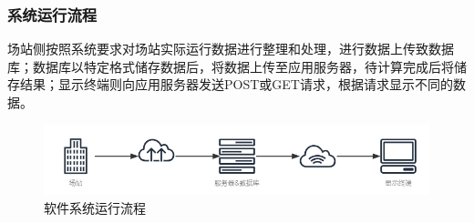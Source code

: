\documentclass[aspectratio=43, 10pt, utf8, mathserif]{beamer}
\begin{document}
	\begin{frame}
		\frametitle{系统运行流程}
		场站侧按照系统要求对场站实际运行数据进行整理和处理，进行数据上传致数据库；数据库以特定格式储存数据后，将数据上传至应用服务器，待计算完成后将储存结果；显示终端则向应用服务器发送POST或GET请求，根据请求显示不同的数据。
		\begin{figure}[H]
			\centering
			\includegraphics[width=0.95\linewidth]{pic/软件系统示意图}
			\caption{软件系统运行流程}
			\label{软件系统运行流程}
		\end{figure}
	\end{frame}
	
\end{document}
